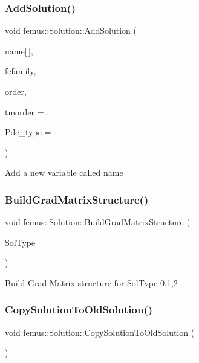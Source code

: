 \subsubsection{\texorpdfstring{Add\+Solution()}{AddSolution()}}
{\footnotesize\ttfamily void femus\+::\+Solution\+::\+Add\+Solution (\begin{DoxyParamCaption}\item[{const char}]{name\mbox{[}$\,$\mbox{]},  }\item[{const \mbox{\hyperlink{_f_elem_type_enum_8hpp_a7c9a70b7c6b5baf5d7942938d770a664}{F\+E\+Family}}}]{fefamily,  }\item[{const \mbox{\hyperlink{_f_elem_type_enum_8hpp_a00ea9562f0dbb25e22bb3297d596e3ba}{F\+E\+Order}}}]{order,  }\item[{const unsigned \&}]{tmorder = {},  }\item[{const bool \&}]{Pde\+\_\+type = {} }\end{DoxyParamCaption})}

Add a new variable called \textquotesingle{}name\textquotesingle{} \mbox{\label{classfemus_1_1_solution_a0e203fd6ffe75140d435c2e6e047f878}} 
\subsubsection{\texorpdfstring{Build\+Grad\+Matrix\+Structure()}{BuildGradMatrixStructure()}}
{\footnotesize\ttfamily void femus\+::\+Solution\+::\+Build\+Grad\+Matrix\+Structure (\begin{DoxyParamCaption}\item[{unsigned}]{Sol\+Type }\end{DoxyParamCaption})}

Build Grad Matrix structure for Sol\+Type 0,1,2 \mbox{\label{classfemus_1_1_solution_a5f68dd8145f5ad4ac80c4eaedfea9309}} 
\subsubsection{\texorpdfstring{Copy\+Solution\+To\+Old\+Solution()}{CopySolutionToOldSolution()}}
{\footnotesize\ttfamily void femus\+::\+Solution\+::\+Copy\+Solution\+To\+Old\+Solution (\begin{DoxyParamCaption}{ }\end{DoxyParamCaption})}

